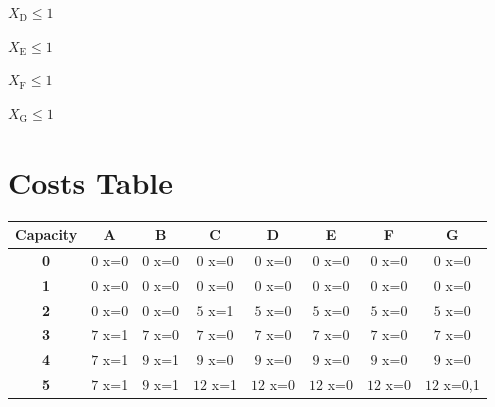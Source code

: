 \documentclass{article}
\begin{document}
$X_{\text{D}} \leq 1$

$X_{\text{E}} \leq 1$

$X_{\text{F}} \leq 1$

$X_{\text{G}} \leq 1$


\section{Costs Table}
\begin{center}
\begin{adjustbox}{max width=\textwidth}
    \begin{tabular}{|c||c|c|c|c|c|c|c|}
        \hline
        \textbf{Capacity} & \textbf{A} & \textbf{B} & \textbf{C} & \textbf{D} & \textbf{E} & \textbf{F} & \textbf{G} \\
        \hline
        \hline
        \textbf{0}& \cellcolor[HTML]{FC3F3F}$0$ x={0}& \cellcolor[HTML]{FC3F3F}$0$ x={0}& \cellcolor[HTML]{FC3F3F}$0$ x={0}& \cellcolor[HTML]{FC3F3F}$0$ x={0}& \cellcolor[HTML]{FC3F3F}$0$ x={0}& \cellcolor[HTML]{FC3F3F}$0$ x={0}& \cellcolor[HTML]{FC3F3F}$0$ x={0}\\
        \hline
        \textbf{1}& \cellcolor[HTML]{FC3F3F}$0$ x={0}& \cellcolor[HTML]{FC3F3F}$0$ x={0}& \cellcolor[HTML]{FC3F3F}$0$ x={0}& \cellcolor[HTML]{FC3F3F}$0$ x={0}& \cellcolor[HTML]{FC3F3F}$0$ x={0}& \cellcolor[HTML]{FC3F3F}$0$ x={0}& \cellcolor[HTML]{FC3F3F}$0$ x={0}\\
        \hline
        \textbf{2}& \cellcolor[HTML]{FC3F3F}$0$ x={0}& \cellcolor[HTML]{FC3F3F}$0$ x={0}& \cellcolor[HTML]{3FFC45}$5$ x={1} & \cellcolor[HTML]{FC3F3F}$5$ x={0}& \cellcolor[HTML]{FC3F3F}$5$ x={0}& \cellcolor[HTML]{FC3F3F}$5$ x={0}& \cellcolor[HTML]{FC3F3F}$5$ x={0}\\
        \hline
        \textbf{3}& \cellcolor[HTML]{3FFC45}$7$ x={1} & \cellcolor[HTML]{FC3F3F}$7$ x={0}& \cellcolor[HTML]{FC3F3F}$7$ x={0}& \cellcolor[HTML]{FC3F3F}$7$ x={0}& \cellcolor[HTML]{FC3F3F}$7$ x={0}& \cellcolor[HTML]{FC3F3F}$7$ x={0}& \cellcolor[HTML]{FC3F3F}$7$ x={0}\\
        \hline
        \textbf{4}& \cellcolor[HTML]{3FFC45}$7$ x={1} & \cellcolor[HTML]{3FFC45}$9$ x={1} & \cellcolor[HTML]{FC3F3F}$9$ x={0}& \cellcolor[HTML]{FC3F3F}$9$ x={0}& \cellcolor[HTML]{FC3F3F}$9$ x={0}& \cellcolor[HTML]{FC3F3F}$9$ x={0}& \cellcolor[HTML]{FC3F3F}$9$ x={0}\\
        \hline
        \textbf{5}& \cellcolor[HTML]{3FFC45}$7$ x={1} & \cellcolor[HTML]{3FFC45}$9$ x={1} & \cellcolor[HTML]{3FFC45}$12$ x={1} & \cellcolor[HTML]{FC3F3F}$12$ x={0}& \cellcolor[HTML]{FC3F3F}$12$ x={0}& \cellcolor[HTML]{FC3F3F}$12$ x={0}& \cellcolor[HTML]{3F62FC}$12$ x={0,1}\\

\end{tabular}
\end{adjustbox}
\end{center}
\end{document}

